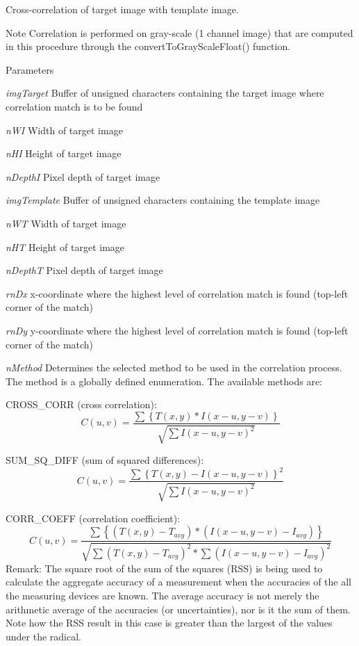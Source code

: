 Cross-\/correlation of target image with template image. \begin{DoxyNote}{Note}
Correlation is performed on gray-\/scale (1 channel image) that are computed in this procedure through the convertToGrayScaleFloat() function. 
\end{DoxyNote}

\begin{DoxyParams}{Parameters}
\item[{\em imgTarget}]Buffer of unsigned characters containing the target image where correlation match is to be found \item[{\em nWI}]Width of target image \item[{\em nHI}]Height of target image \item[{\em nDepthI}]Pixel depth of target image \item[{\em imgTemplate}]Buffer of unsigned characters containing the template image \item[{\em nWT}]Width of target image \item[{\em nHT}]Height of target image \item[{\em nDepthT}]Pixel depth of target image \item[{\em rnDx}]x-\/coordinate where the highest level of correlation match is found (top-\/left corner of the match) \item[{\em rnDy}]y-\/coordinate where the highest level of correlation match is found (top-\/left corner of the match) \item[{\em nMethod}]Determines the selected method to be used in the correlation process. The method is a globally defined enumeration. The available methods are:
\begin{DoxyItemize}
\item CROSS\_\-CORR (cross correlation): \[ C(u,v) = \frac {\sum{\left\{T(x,y) * I(x-u,y-v)\right\}}} {\sqrt{ \sum{I(x-u,y-v)^2}}} \]
\item SUM\_\-SQ\_\-DIFF (sum of squared differences): \[ C(u,v) = \frac {\sum{\left\{T(x,y)-I(x-u,y-v)\right\}^2}} {\sqrt{\sum{I(x-u,y-v)^2}}} \]
\item CORR\_\-COEFF (correlation coefficient): \[ C(u,v) = \frac {\sum{\left\{(T(x,y)-T_{avg}) * (I(x-u,y-v)-I_{avg})\right\}}} {\sqrt{\sum{(T(x,y)-T_{avg})^2} * \sum{(I(x-u,y-v)-I_{avg})^2}}} \] Remark: The square root of the sum of the squares (RSS) is being used to calculate the aggregate accuracy of a measurement when the accuracies of the all the measuring devices are known. The average accuracy is not merely the arithmetic average of the accuracies (or uncertainties), nor is it the sum of them. Note how the RSS result in this case is greater than the largest of the values under the radical.

\end{DoxyItemize}
\end{DoxyParams}
